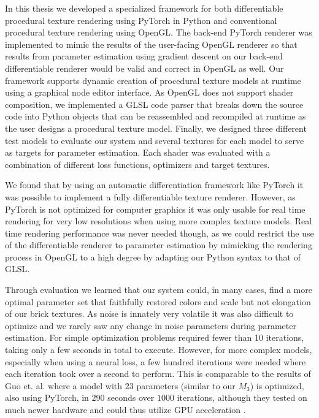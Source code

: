 In this thesis we developed a specialized framework for both differentiable procedural texture rendering using PyTorch in Python and conventional procedural texture rendering using OpenGL. The back-end PyTorch renderer was implemented to mimic the results of the user-facing OpenGL renderer so that results from parameter estimation using gradient descent on our back-end differentiable renderer would be valid and correct in OpenGL as well. Our framework supports dynamic creation of procedural texture models at runtime using a graphical node editor interface. As OpenGL does not support shader composition, we implemented a GLSL code parser that breaks down the source code into Python objects that can be reassembled and recompiled at runtime as the user designs a procedural texture model. Finally, we designed three different test models to evaluate our system and several textures for each model to serve as targets for parameter estimation. Each shader was evaluated with a combination of different loss functions, optimizers and target textures.

We found that by using an automatic differentiation framework like PyTorch it was possible to implement a fully differentiable texture renderer. However, as PyTorch is not optimized for computer graphics it was only usable for real time rendering for very low resolutions when using more complex texture models. Real time rendering performance was never needed though, as we could restrict the use of the differentiable renderer to parameter estimation by mimicking the rendering process in OpenGL to a high degree by adapting our Python syntax to that of GLSL.

Through evaluation we learned that our system could, in many cases, find a more optimal parameter set that faithfully restored colors and scale but not elongation of our brick textures. As noise is innately very volatile it was also difficult to optimize and we rarely saw any change in noise parameters during parameter estimation. For simple optimization problems \dipter{} required fewer than 10 iterations, taking only a few seconds in total to execute. However, for more complex models, especially when using a neural loss, a few hundred iterations were needed where each iteration took over a second to perform. This is comparable to the results of Guo et. al. where a model with $23$ parameters (similar to our $M_3$) is optimized, also using PyTorch, in $290$ seconds over $1000$ iterations, although they tested on much newer hardware and could thus utilize GPU acceleration \cite{guo_2019_a}.

